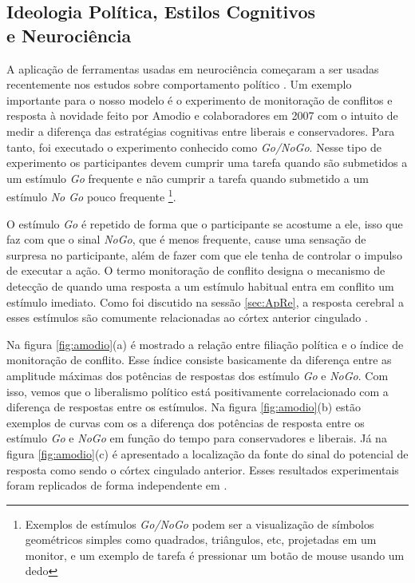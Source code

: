 \subsection{Ideologia Política, Estilos Cognitivos \\e Neurociência} %
\label{subsec:neuropol}

A aplicação de ferramentas usadas em neurociência começaram a ser usadas
recentemente nos estudos sobre comportamento político . Um
exemplo importante para o nosso modelo é o experimento de monitoração de
conflitos e resposta à novidade feito por Amodio e colaboradores em 2007
\citep{Amodio2007} com o intuito de medir a diferença das estratégias
cognitivas entre liberais e conservadores. Para tanto, foi executado o
experimento conhecido como \textit{Go/NoGo}. Nesse tipo de experimento
os participantes devem cumprir uma tarefa quando são submetidos a um
estímulo \textit{Go} frequente e não cumprir a tarefa quando submetido a
um estímulo \textit{No Go} pouco frequente \footnote{Exemplos de estímulos
\textit{Go/NoGo} podem ser a visualização de símbolos geométricos simples
como quadrados, triângulos, etc, projetadas em um monitor, e um exemplo de
tarefa é pressionar um botão de mouse usando um dedo}.

O estímulo \textit{Go} é repetido de forma que o participante se acostume
a ele, isso que faz com que o sinal \textit{NoGo}, que é menos frequente,
cause uma sensação de surpresa no participante, além de fazer com que ele
tenha de controlar o impulso de executar a ação.  O termo monitoração
de conflito designa o mecanismo de detecção de  quando uma resposta a
um estímulo habitual entra em conflito um estímulo imediato. Como foi
discutido na sessão \ref{sec:ApRe}, a resposta cerebral a esses estímulos
são comumente relacionadas ao córtex anterior cingulado \citep{Yeung2004}.

Na figura \ref{fig:amodio}(a) é mostrado a relação entre filiação
política e o índice de monitoração de conflito. Esse índice consiste
basicamente da diferença entre as amplitude máximas dos potências de
respostas dos estímulo \textit{Go} e \textit{NoGo}. Com isso, vemos que o
liberalismo político está positivamente correlacionado com a diferença
de respostas entre os estímulos. Na figura \ref{fig:amodio}(b) estão
exemplos de curvas com os a diferença dos potências de resposta entre os
estímulo \textit{Go} e \textit{NoGo} em função do tempo para conservadores
e liberais. Já na figura \ref{fig:amodio}(c) é apresentado a localização
da fonte do sinal do potencial de resposta como sendo o córtex cingulado
anterior. Esses resultados experimentais foram replicados de forma independente
em \citep{Weissflog2010}.

